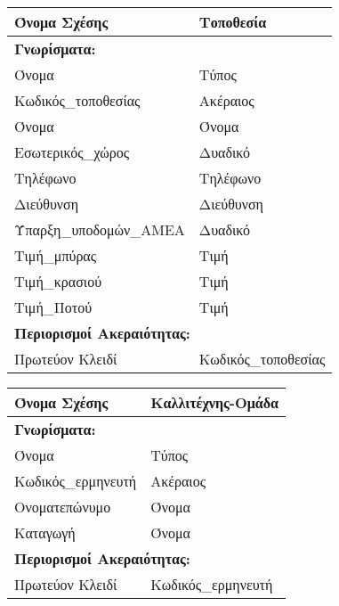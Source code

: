 \begin{tabular}{|p{6cm}|p{8cm}|}
  \hline
  Όνομα Σχέσης         & Τοποθεσία                         \\ \hline
  \multicolumn{2}{|l|}{\textbf{Γνωρίσματα:}}               \\ \hline
  Όνομα                & Τύπος                             \\ \hline
  Κωδικός\_τοποθεσίας   & Ακέραιος                          \\ \hline
  Όνομα                & Όνομα                             \\ \hline
  Εσωτερικός\_χώρος     & Δυαδικό                           \\ \hline
  Τηλέφωνο             & Τηλέφωνο                          \\ \hline
  Διεύθυνση            & Διεύθυνση                         \\ \hline
  Ύπαρξη\_υποδομών\_ΑΜΕΑ & Δυαδικό                           \\ \hline
  Τιμή\_μπύρας          & Τιμή                              \\ \hline
  Τιμή\_κρασιού         & Τιμή                              \\ \hline
  Τιμή\_Ποτού           & Τιμή                              \\ \hline
  \multicolumn{2}{|l|}{\textbf{Περιορισμοί Ακεραιότητας:}} \\ \hline
  Πρωτεύον Κλειδί      & Κωδικός\_τοποθεσίας                \\ \hline
\end{tabular}


\begin{tabular}{|p{6cm}|p{8cm}|}
  \hline
  Όνομα Σχέσης      & Καλλιτέχνης-Ομάδα                    \\ \hline
  \multicolumn{2}{|l|}{\textbf{Γνωρίσματα:}}               \\ \hline
  Όνομα             & Τύπος                                \\ \hline
  Κωδικός\_ερμηνευτή & Ακέραιος                             \\ \hline
  Ονοματεπώνυμο     & Όνομα                                \\ \hline
  Καταγωγή          & Όνομα                                \\ \hline
  \multicolumn{2}{|l|}{\textbf{Περιορισμοί Ακεραιότητας:}} \\ \hline
  Πρωτεύον Κλειδί   & Κωδικός\_ερμηνευτή                    \\ \hline
\end{tabular}

